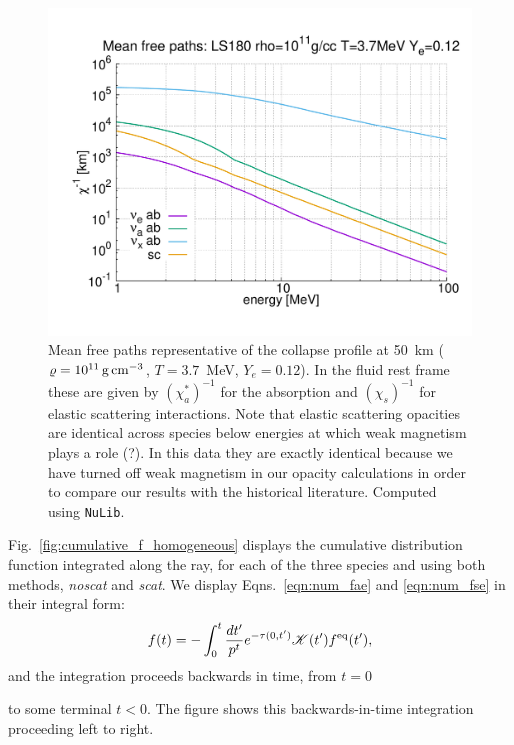 \documentclass[aps,floatfix,prd,superscriptaddress,twocolumn]{revtex4-1}
\newcommand{\todo}[1]{\marginpar{\tiny{\textcolor{red}{#1}}}}
\renewcommand\todo[1]{} %
\begin{document}
\begin{figure}
  \includegraphics[width=\columnwidth]{figure-mfps-50km}
  \caption{Mean free paths
    representative of the collapse profile at
    50~km ($\varrho=10^{11}\,{\rm g}\,{\rm cm}^{-3}$,
    $T=3.7$~MeV, $Y_e=0.12$).
    In the fluid rest frame these are given by
    $(\chi^*_a)^{-1}$ for the absorption
    and $(\chi_s)^{-1}$ for elastic scattering interactions.
    Note that elastic scattering opacities are identical across species
    below energies at which weak magnetism plays a role \cite{horo2002-weak_mag}
    (?).
    In this data they are exactly identical
    because we have turned off weak magnetism in our opacity calculations
    in order to compare our results with the historical literature.
    Computed using \lstinline{NuLib}.
  }
  \label{fig:mfps-50km}
\end{figure}

Fig.~\ref{fig:cumulative_f_homogeneous} displays the cumulative distribution
function integrated along the ray, for each of the three species and using
both methods, \emph{noscat} and \emph{scat}. We display
Eqns.~\ref{eqn:num_fae} and \ref{eqn:num_fse} in their integral form:
\begin{equation}
  \label{eqn:cumulative_f}
  f(t)
  = - \int_{0}^t \frac{dt'}{p^t}e^{-\tau(0,t')}
  \mathscr{K}(t')f^{\rm eq}(t'),
\end{equation}
and the integration proceeds backwards in time, from $t=0$
\todo{could write more simply because Minkowski}
to some terminal $t<0$.
The figure shows this backwards-in-time integration proceeding left to right.
\end{document}

